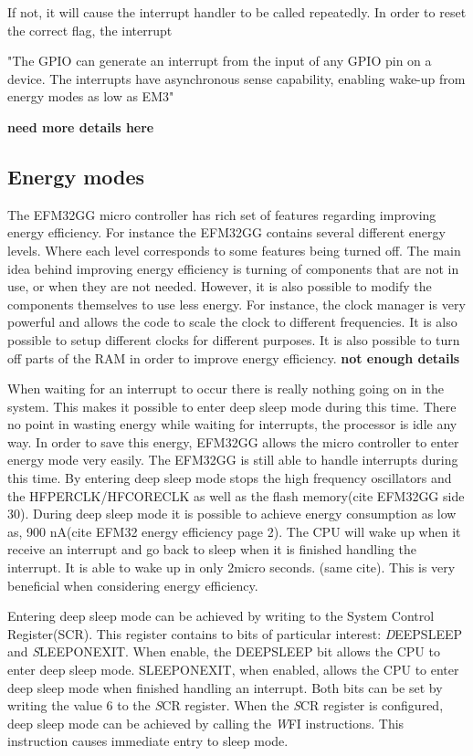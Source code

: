 If not, it will cause the interrupt handler to be called repeatedly. In order to reset the correct flag, the interrupt 



"The GPIO can generate an interrupt from the input of any GPIO pin on a device. The interrupts have asynchronous sense capability, enabling wake-up from energy modes as low as EM3" 


{\bf need more details here}


\subsection{Energy modes}\label{ch:energy_modes} 
The EFM32GG micro controller has rich set of features regarding improving energy efficiency. For instance the EFM32GG contains several different energy levels. Where each level corresponds to some features being turned off. The main idea behind improving energy efficiency is turning of components that are not in use, or when they are not needed. However, it is also possible to modify the components themselves to use less energy. For instance, the clock manager is very powerful and allows the code to scale the clock to different frequencies. It is also possible to setup different clocks for different purposes. It is also possible to turn off parts of the RAM in order to improve energy efficiency. {\bf not enough details}


When waiting for an interrupt to occur there is really nothing going on in the system. This makes it possible to enter deep sleep mode during this time. There no point in wasting energy while waiting for interrupts, the processor is idle any way. In order to save this energy, EFM32GG allows the micro controller to enter energy mode very easily. The EFM32GG is still able to handle interrupts during this time. By entering deep sleep mode stops the high frequency oscillators and the HFPERCLK/HFCORECLK as well as the flash memory(cite EFM32GG side 30). During deep sleep mode it is possible to achieve energy consumption as low as, 900 nA(cite EFM32 energy efficiency page 2). The CPU will wake up when it receive an interrupt and go back to sleep when it is finished handling the interrupt. It is able to wake up in only 2micro seconds. (same cite). This is very beneficial when considering energy efficiency.   

Entering deep sleep mode can be achieved by writing to the System Control Register(SCR). This register contains to bits of particular interest: \emph DEEPSLEEP and \emph SLEEPONEXIT. When enable, the DEEPSLEEP bit allows the CPU to enter deep sleep mode. SLEEPONEXIT, when enabled, allows the CPU to enter deep sleep mode when finished handling an interrupt. Both bits can be set by writing the value 6 to the \emph SCR register. When the \emph SCR register is configured, deep sleep mode can be achieved by calling the \emph WFI instructions. This instruction causes immediate entry to sleep mode. 
